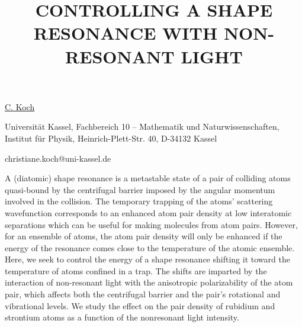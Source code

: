 \title{CONTROLLING A SHAPE RESONANCE WITH NON-RESONANT LIGHT}

\underline{C. Koch} 

{\normalsize{\vspace{-4mm}}
Universit\"{a}t Kassel,
Fachbereich 10 -- Mathematik und Naturwissenschaften,
Institut f\"{u}r Physik,
Heinrich-Plett-Str. 40,
D-34132 Kassel

\email christiane.koch@uni-kassel.de}

A (diatomic) shape resonance is a metastable state of a pair of colliding atoms quasi-bound by the centrifugal barrier imposed by the angular momentum involved in the collision. The temporary trapping of the atoms' scattering wavefunction corresponds to an enhanced atom pair density at low interatomic separations which can be useful for making molecules from atom pairs. However, for an ensemble of atoms, the atom pair density will only be enhanced if the energy of the resonance comes close to the temperature of the atomic ensemble. Here, we seek to control the energy of a shape resonance shifting it toward the temperature of atoms confined in a trap. The shifts are imparted by the interaction of non-resonant light with the anisotropic polarizability of the atom  pair, which affects both the centrifugal barrier and the pair's rotational and vibrational levels. We study the effect on the pair density of rubidium and strontium atoms as a function of the nonresonant light intensity.

\vspace{\baselineskip}

